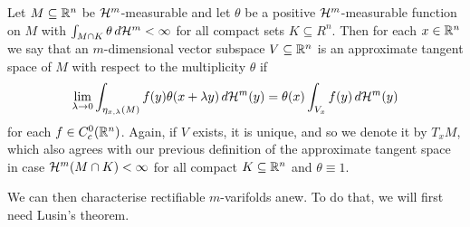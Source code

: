 \begin{definition}
Let $M \subseteq \mathbb{R}^n$ be $\mathcal{H}^m$-measurable and let $\theta$ be a positive $\mathcal{H}^m$-measurable function on $M$ with $\int_{M \cap K}\theta \, d\mathcal{H}^m < \infty$ for all compact sets $K \subseteq R^n$. Then for each $x \in \mathbb{R}^n$ we say that an $m$-dimensional vector subspace $V \subseteq \mathbb{R}^n$ is an approximate tangent space of $M$ with respect to the multiplicity $\theta$ if
\[
    \lim_{\lambda \to 0} \int_{\eta_{x,\lambda}(M)}f(y)\theta(x+\lambda y)\, d\mathcal{H}^m(y) = \theta(x)\int_{V_x} f(y) \, d\mathcal{H}^m(y)
\]
for each $f \in C_c^0(\mathbb{R}^n)$. Again, if $V$ exists, it is unique, and so we denote it by $T_xM$, which also agrees with our previous definition of the approximate tangent space in case $\mathcal{H}^m(M \cap K) < \infty$ for all compact $K \subseteq \mathbb{R}^n$ and $\theta \equiv 1$.
\end{definition}

We can then characterise rectifiable $m$-varifolds anew. To do that, we will first need Lusin's theorem.

